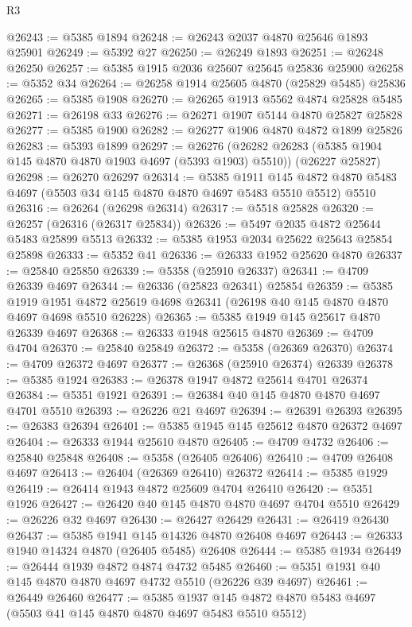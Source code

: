 \begin{lexlean}{R3}
\begin{coremodule}
@26243 := @5385 @1894
@26248 := @26243 @2037 @4870 @25646 @1893 @25901
@26249 := @5392 @27
@26250 := @26249 @1893
@26251 := @26248 @26250
@26257 := @5385 @1915 @2036 @25607 @25645 @25836 @25900
@26258 := @5352 @34
@26264 := @26258 @1914 @25605 @4870 (@25829 @5485) @25836
@26265 := @5385 @1908
@26270 := @26265 @1913 @5562 @4874 @25828 @5485
@26271 := @26198 @33
@26276 := @26271 @1907 @5144 @4870 @25827 @25828
@26277 := @5385 @1900
@26282 := @26277 @1906 @4870 @4872 @1899 @25826
@26283 := @5393 @1899
@26297 := @26276
    (@26282 @26283 (@5385 @1904 @145 @4870 @4870 @1903 @4697 (@5393 @1903) @5510))
    (@26227 @25827)
@26298 := @26270 @26297
@26314 := @5385
    @1911
    @145
    @4872
    @4870
    @5483
    @4697
    (@5503 @34 @145 @4870 @4870 @4697 @5483 @5510 @5512)
    @5510
@26316 := @26264 (@26298 @26314)
@26317 := @5518 @25828
@26320 := @26257 (@26316 (@26317 @25834))
@26326 := @5497 @2035 @4872 @25644 @5483 @25899 @5513
@26332 := @5385 @1953 @2034 @25622 @25643 @25854 @25898
@26333 := @5352 @41
@26336 := @26333 @1952 @25620 @4870
@26337 := @25840 @25850
@26339 := @5358 (@25910 @26337)
@26341 := @4709 @26339 @4697
@26344 := @26336 (@25823 @26341) @25854
@26359 := @5385
    @1919
    @1951
    @4872
    @25619
    @4698
    @26341
    (@26198 @40 @145 @4870 @4870 @4697 @4698 @5510 @26228)
@26365 := @5385 @1949 @145 @25617 @4870 @26339 @4697
@26368 := @26333 @1948 @25615 @4870
@26369 := @4709 @4704
@26370 := @25840 @25849
@26372 := @5358 (@26369 @26370)
@26374 := @4709 @26372 @4697
@26377 := @26368 (@25910 @26374) @26339
@26378 := @5385 @1924
@26383 := @26378 @1947 @4872 @25614 @4701 @26374
@26384 := @5351 @1921
@26391 := @26384 @40 @145 @4870 @4870 @4697 @4701 @5510
@26393 := @26226 @21 @4697
@26394 := @26391 @26393
@26395 := @26383 @26394
@26401 := @5385 @1945 @145 @25612 @4870 @26372 @4697
@26404 := @26333 @1944 @25610 @4870
@26405 := @4709 @4732
@26406 := @25840 @25848
@26408 := @5358 (@26405 @26406)
@26410 := @4709 @26408 @4697
@26413 := @26404 (@26369 @26410) @26372
@26414 := @5385 @1929
@26419 := @26414 @1943 @4872 @25609 @4704 @26410
@26420 := @5351 @1926
@26427 := @26420 @40 @145 @4870 @4870 @4697 @4704 @5510
@26429 := @26226 @32 @4697
@26430 := @26427 @26429
@26431 := @26419 @26430
@26437 := @5385 @1941 @145 @14326 @4870 @26408 @4697
@26443 := @26333 @1940 @14324 @4870 (@26405 @5485) @26408
@26444 := @5385 @1934
@26449 := @26444 @1939 @4872 @4874 @4732 @5485
@26460 := @5351 @1931 @40 @145 @4870 @4870 @4697 @4732 @5510 (@26226 @39 @4697)
@26461 := @26449 @26460
@26477 := @5385
    @1937
    @145
    @4872
    @4870
    @5483
    @4697
    (@5503 @41 @145 @4870 @4870 @4697 @5483 @5510 @5512)

\end{coremodule}
\end{lexlean}
